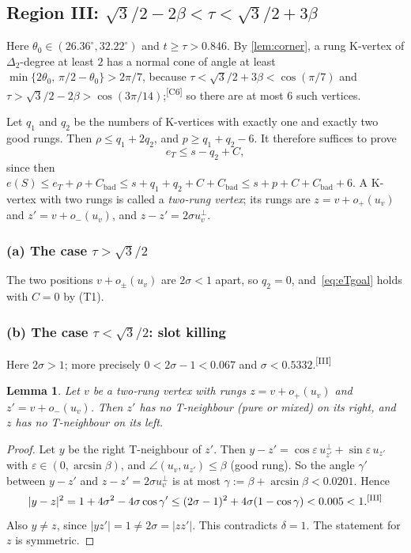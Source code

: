 \documentclass[11pt]{amsart}
\newtheorem{lemma}[theorem]{Lemma}
\theoremstyle{definition}
\theoremstyle{remark}
\newcommand{\Dt}{\Delta_2}
\newcommand{\eps}{\varepsilon}
\newcommand{\chk}[1]{\textsuperscript{[#1]}}
\begin{document}
\subsection{Region III: \texorpdfstring{$\sqrt3/2-2\beta<\tau<\sqrt3/2+3\beta$}{sqrt3/2 - 2 beta < tau < sqrt3/2 + 3 beta}}\label{sec:regionIII}
Here $\theta_0\in(26.36^\circ,32.22^\circ)$ and $t\ge\tau>0.846$. By \cref{lem:corner}, a rung K-vertex of $\Dt$-degree at least $2$ has a normal cone of angle at least $\min\{2\theta_0,\,\pi/2-\theta_0\}>2\pi/7$, because $\tau<\sqrt3/2+3\beta<\cos(\pi/7)$ and $\tau>\sqrt3/2-2\beta>\cos(3\pi/14)$;\chk{C6} so there are at most $6$ such vertices.

Let $q_1$ and $q_2$ be the numbers of K-vertices with exactly one and exactly two good rungs. Then $\rho\le q_1+2q_2$, and $p\ge q_1+q_2-6$. It therefore suffices to prove
\begin{equation}\label{eq:eTgoal}
e_T\le s-q_2+C,
\end{equation}
since then $e(S)\le e_T+\rho+C_{\mathrm{bad}}\le s+q_1+q_2+C+C_{\mathrm{bad}}\le s+p+C+C_{\mathrm{bad}}+6$. A K-vertex with two rungs is called a \emph{two-rung vertex}; its rungs are $z=v+o_+(u_v)$ and $z'=v+o_-(u_v)$, and $z-z'=2\sigma u_v^\perp$.

\subsubsection*{(a) The case $\tau>\sqrt3/2$}
The two positions $v+o_\pm(u_v)$ are $2\sigma<1$ apart, so $q_2=0$, and~\eqref{eq:eTgoal} holds with $C=0$ by (T1).

\subsubsection*{(b) The case $\tau<\sqrt3/2$: slot killing}
Here $2\sigma>1$; more precisely $0<2\sigma-1<0.067$ and $\sigma<0.5332$.\chk{III}

\begin{lemma}\label{lem:slotkill}
Let $v$ be a two-rung vertex with rungs $z=v+o_+(u_v)$ and $z'=v+o_-(u_v)$. Then $z'$ has no T-neighbour \textup{(}pure or mixed\textup{)} on its right, and $z$ has no T-neighbour on its left.
\end{lemma}
\begin{proof}
Let $y$ be the right T-neighbour of $z'$. Then $y-z'=\cos\eps\,u_{z'}^\perp+\sin\eps\,u_{z'}$ with $\eps\in(0,\arcsin\beta)$, and $\angle(u_v,u_{z'})\le\beta$ (good rung). So the angle $\gamma'$ between $y-z'$ and $z-z'=2\sigma u_v^\perp$ is at most $\gamma:=\beta+\arcsin\beta<0.0201$. Hence
\[
|y-z|^2=1+4\sigma^2-4\sigma\cos\gamma'\le(2\sigma-1)^2+4\sigma(1-\cos\gamma)<0.005<1.\chk{III}
\]
Also $y\neq z$, since $|yz'|=1\neq2\sigma=|zz'|$. This contradicts $\delta=1$. The statement for $z$ is symmetric.
\end{proof}
\end{document}

